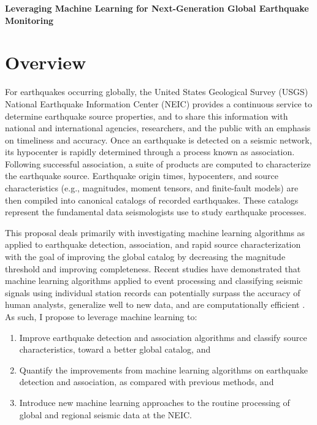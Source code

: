 \documentclass[12p]{article}
\begin{document}
\begin{center}\Large\textbf{Leveraging Machine Learning for Next-Generation Global Earthquake Monitoring}\end{center}

\section{Overview}

For earthquakes occurring globally, the United States Geological Survey (USGS) National Earthquake Information Center
(NEIC) provides a continuous service to determine earthquake source properties, and to share this information with
national and international agencies, researchers, and the public with an emphasis on timeliness and accuracy. Once an
earthquake is detected on a seismic network, its hypocenter is rapidly determined through a process known as
association. Following successful association, a suite of products are computed to characterize the earthquake source.
Earthquake origin times, hypocenters, and source characteristics (e.g., magnitudes, moment tensors, and finite-fault
models) are then compiled into canonical catalogs of recorded earthquakes. These catalogs represent the fundamental data
seismologists use to study earthquake processes.

This proposal deals primarily with investigating machine learning algorithms as applied to earthquake detection,
association, and rapid source characterization with the goal of improving the global catalog by decreasing the magnitude
threshold and improving completeness. Recent studies have demonstrated that machine learning algorithms applied to event
processing and classifying seismic signals using individual station records can potentially surpass the accuracy of
human analysts, generalize well to new data, and are computationally efficient \citep{Perol2018, Ross2018a, Ross2018b,
Zhu2019a, Zhu2019b, Mousavi2019}. As such, I propose to leverage machine learning to:

\begin{enumerate}\bfseries
  \item Improve earthquake detection and association algorithms and classify source characteristics, toward a better
  global catalog, and
  \item Quantify the improvements from machine learning algorithms on earthquake detection and association, as compared
  with previous methods, and
  \item Introduce new machine learning approaches to the routine processing of global and regional seismic data at the
  NEIC.
\end{enumerate}
\end{document}
